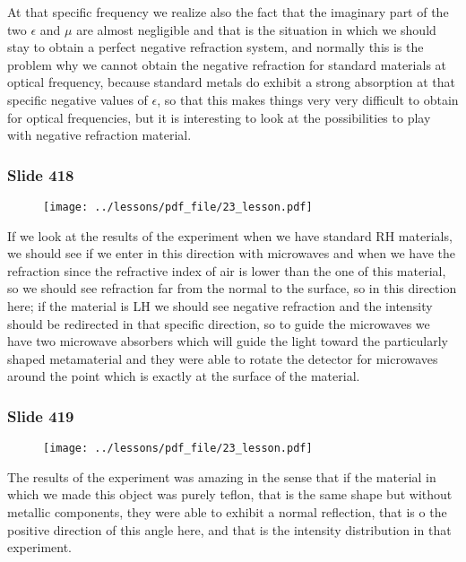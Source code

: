 \documentclass[../main/main.tex]{subfiles}
\begin{document}
At that specific frequency we realize also the fact that the imaginary part of the two $\epsilon$ and $\mu$ are almost negligible and that is the situation in which we should stay to obtain a perfect negative refraction system, and normally this is the problem why we cannot obtain the negative refraction for standard materials at optical frequency, because standard metals do exhibit a strong absorption at that specific negative values of $\epsilon$, so that this makes things very very difficult to obtain for optical frequencies, but it is interesting to look at the possibilities to play with negative refraction material.

\newpage

\subsubsection{Slide 418}

\begin{figure}[h!]
\centering
\texttt{[image: ../lessons/pdf\_file/23\_lesson.pdf]}
\end{figure}

If we look at the results of the experiment when we have standard RH materials, we should see if we enter in this direction with microwaves and when we have the refraction since the refractive index of air is lower than the one of this material, so we should see refraction far from the normal to the surface, so in this direction here; if the material is LH we should see negative refraction and the intensity should be redirected in that specific direction, so to guide the microwaves we have two microwave absorbers which will guide the light toward the particularly shaped metamaterial and they were able to rotate the detector for microwaves around the point which is exactly at the surface of the material.

\newpage

\subsubsection{Slide 419}

\begin{figure}[h!]
\centering
\texttt{[image: ../lessons/pdf\_file/23\_lesson.pdf]}
\end{figure}

The results of the experiment was amazing in the sense that if the material in which we made this object was purely teflon, that is the same shape but without metallic components, they were able to exhibit a normal reflection, that is o the positive direction of this angle here, and that is the intensity distribution in that experiment.
\end{document}
